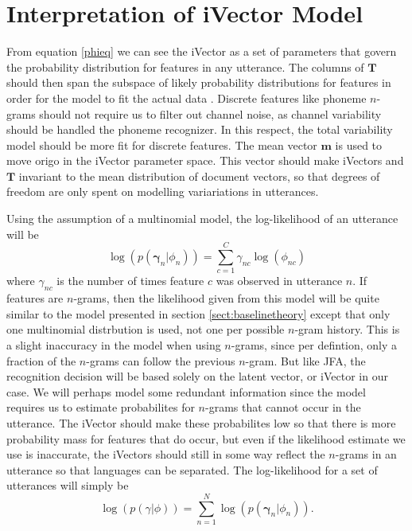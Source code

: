\section{Interpretation of iVector Model}

From equation \ref{phieq} we can see the iVector as a set of parameters that govern the probability distribution for features in any utterance. The columns of $\mathbf{T}$ should then span the subspace of likely probability distributions for features in order for the model to fit the actual data \cite{srivector}. Discrete features like phoneme $n$-grams should not require us to filter out channel noise, as channel variability should be handled the phoneme recognizer. In this respect, the total variability model should be more fit for discrete features. The mean vector $\mathbf{m}$ is used to move origo in the iVector parameter space. This vector should make iVectors and $\mathbf{T}$ invariant to the mean distribution of document vectors, so that degrees of freedom are only spent on modelling variariations in utterances.

 Using the assumption of a multinomial model, the log-likelihood of an utterance will be
\begin{equation}
\label{utterancelike}
\log(p(\mathbf{\gamma}_n | \phi_n)) = \sum_{c=1}^C \gamma_{nc} \log(\phi_{nc})
\end{equation}
where $\gamma_{nc}$ is the number of times feature $c$ was observed in utterance $n$. If features are $n$-grams, then the likelihood given from this model will be quite similar to the model presented in section \ref{sect:baselinetheory} except that only one multinomial distrbution is used, not one per possible $n$-gram history. This is a slight inaccuracy in the model when using $n$-grams, since per defintion, only a fraction of the $n$-grams can follow the previous $n$-gram. But like JFA, the recognition decision will be based solely on the latent vector, or iVector in our case. We will perhaps model some redundant information since the model requires us to estimate probabilites for $n$-grams that cannot occur in the utterance. The iVector should make these probabilites low so that there is more probability mass for features that do occur, but even if the likelihood estimate we use is inaccurate, the iVectors should still in some way reflect the $n$-grams in an utterance so that languages can be separated. The log-likelihood for a set of utterances will simply be
\begin{equation}
\label{iloglike}
\log(p(\gamma | \phi)) = \sum_{n=1}^N \log(p(\mathbf{\gamma}_n | \phi_n)).
\end{equation}

